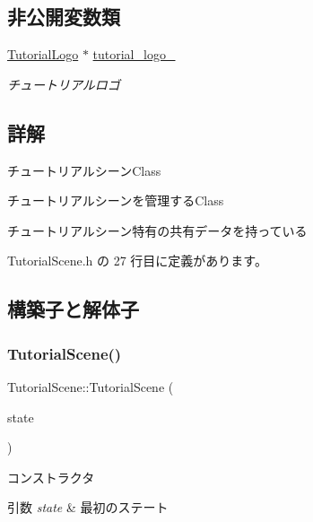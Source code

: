 \subsection*{非公開変数類}
\begin{DoxyCompactItemize}
\item 
\mbox{\hyperlink{class_tutorial_logo}{Tutorial\+Logo}} $\ast$ \mbox{\hyperlink{class_tutorial_scene_a3c2e0e47c2e6078bb7eff928d72fde2a}{tutorial\+\_\+logo\+\_\+}}
\begin{DoxyCompactList}\small\item\em チュートリアルロゴ \end{DoxyCompactList}\end{DoxyCompactItemize}


\subsection{詳解}
チュートリアルシーン\+Class 

チュートリアルシーンを管理する\+Class

チュートリアルシーン特有の共有データを持っている 

 Tutorial\+Scene.\+h の 27 行目に定義があります。



\subsection{構築子と解体子}
\mbox{\label{class_tutorial_scene_a90f8c010bd72aa3dae61a5294fdfbeb7}} 
\subsubsection{\texorpdfstring{Tutorial\+Scene()}{TutorialScene()}}
{\footnotesize\ttfamily Tutorial\+Scene\+::\+Tutorial\+Scene (\begin{DoxyParamCaption}\item[{\mbox{\hyperlink{class_scene_base_1_1_state_base}{State\+Base}} $\ast$}]{state }\end{DoxyParamCaption})\hspace{0.3cm}{\ttfamily [inline]}}



コンストラクタ 


\begin{DoxyParams}{引数}
{\em state} & 最初のステート \\
\hline
\end{DoxyParams}


